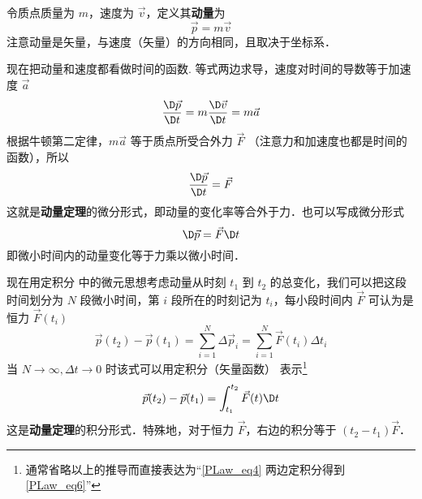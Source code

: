 

令质点质量为 $m$，速度为 $\vec v$，定义其\textbf{动量}为
\begin{equation}
\vec p = m\vec v
\end{equation}
注意动量是矢量，与速度（矢量）的方向相同，且取决于坐标系．

现在把动量和速度都看做时间的函数. 等式两边求导，速度对时间的导数等于加速度 $\vec a$
\begin{equation}
\frac{\D\vec p}{\D t} = m\frac{\D\vec v}{{\D t}} = m\vec a
\end{equation}
根据牛顿第二定律，$m\vec a$ 等于质点所受合外力 $\vec F$ （注意力和加速度也都是时间的函数），所以
\begin{equation}
\frac{\D\vec p}{\D t} = \vec F
\end{equation}
这就是\textbf{动量定理}的微分形式，即动量的变化率等合外于力．也可以写成微分形式
\begin{equation}\label{PLaw_eq4}
\D\vec p = \vec F\D t
\end{equation}
即微小时间内的动量变化等于力乘以微小时间．

现在用定积分 中的微元思想考虑动量从时刻 $t_1$ 到 $t_2$ 的总变化，我们可以把这段时间划分为 $N$ 段微小时间，第 $i$ 段所在的时刻记为 $t_i$，每小段时间内 $\vec F$ 可认为是恒力 $\vec F(t_i)$
\begin{equation}
\vec p(t_2)-\vec p(t_1) = \sum_{i=1}^{N} \Delta\vec p_i= \sum_{i=1}^{N} \vec F(t_i) \Delta t_i
\end{equation}
当 $N\to\infty, \Delta t\to 0$ 时该式可以用定积分（矢量函数）%
表示\footnote{通常省略以上的推导而直接表达为“\autoref{PLaw_eq4} 两边定积分得到\autoref{PLaw_eq6}”}
\begin{equation}\label{PLaw_eq6}
\vec p(t_2)-\vec p(t_1) = \int_{t_1}^{t_2}\vec F(t) \D t
\end{equation}
这是\textbf{动量定理}的积分形式．特殊地，对于恒力 $\vec F$，右边的积分等于 $(t_2-t_1)\vec F$．